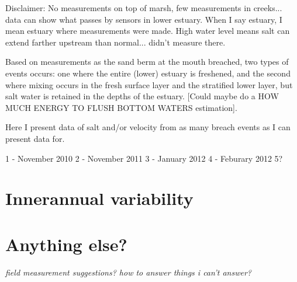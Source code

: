 {Disclaimer: No measurements on top of marsh, few measurements in
creeks... data can show what passes by sensors in lower estuary. When I
say estuary, I mean estuary where measurements were made. High water
level means salt can extend farther upstream than normal... didn't
measure there}.

Based on measurements as the sand berm at the mouth breached, two types
of events occurs: one where the entire (lower) estuary is freshened, and
the second where mixing occurs in the fresh surface layer and the
stratified lower layer, but salt water is retained in the depths of the
estuary. [Could maybe do a HOW MUCH ENERGY TO FLUSH BOTTOM WATERS
estimation].

Here I present data of salt and/or velocity from as many breach events
as I can present data for.

1 - November 2010 2 - November 2011 3 - January 2012 4 - Feburary 2012
5?








\section{Innerannual variability} \label{InnannVar}

\section{Anything else?} \label{backofch2}

\emph{field measurement suggestions? how to answer things i can't
answer?}


